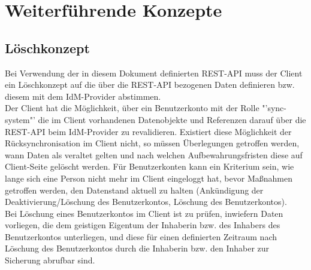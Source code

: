 \chapter{Weiterführende Konzepte}

\section{Löschkonzept}

Bei Verwendung der in diesem Dokument definierten REST-API muss der Client ein Löschkonzept auf die über die REST-API bezogenen Daten definieren bzw. diesem mit dem IdM-Provider abstimmen.\\

Der Client hat die Möglichkeit, über ein Benutzerkonto mit der Rolle "'sync-system"' die im Client vorhandenen Datenobjekte und Referenzen darauf über die REST-API beim IdM-Provider zu revalidieren. 
Existiert diese Möglichkeit der Rücksynchronisation im Client nicht, so müssen Überlegungen getroffen werden, wann Daten als veraltet gelten und nach welchen Aufbewahrungsfristen diese auf Client-Seite gelöscht werden. 
Für Benutzerkonten kann ein Kriterium sein, wie lange sich eine Person nicht mehr im Client eingeloggt hat, bevor Maßnahmen getroffen werden, den Datenstand aktuell zu halten (Ankündigung der Deaktivierung/Löschung des Benutzerkontos, Löschung des Benutzerkontos). \\

Bei Löschung eines Benutzerkontos im Client ist zu prüfen, inwiefern Daten vorliegen, die dem geistigen Eigentum der Inhaberin bzw. des Inhabers des Benutzerkontos unterliegen, und diese für einen definierten Zeitraum nach Löschung des Benutzerkontos durch die Inhaberin bzw. den Inhaber zur Sicherung abrufbar sind.
